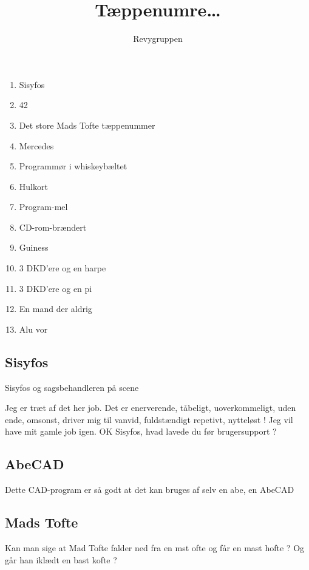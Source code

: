\documentclass[danish]{article}
\title{Tæppenumre\ldots}
\author{Revygruppen}
\begin{document}
\maketitle

\begin{sketch}
\begin{enumerate}
\item Sisyfos
\item 42
\item Det store Mads Tofte tæppenummer
\item Mercedes
\item Programmør i whiskeybæltet
\item Hulkort
\item Program-mel
\item CD-rom-brændert
\item Guiness
\item 3 DKD'ere og en harpe
\item 3 DKD'ere og en pi
\item En mand der aldrig
\item Alu vor
\end{enumerate}

\subsection*{Sisyfos}
\begin{roles}
\end{roles}

\scene Sisyfos og sagsbehandleren på scene

 Jeg er træt af det her job. Det er enerverende, tåbeligt,
uoverkommeligt, uden ende, omsonst, driver mig til vanvid, fuldstændigt
repetivt, nytteløst ! Jeg vil have mit gamle job igen.
 OK Sisyfos, hvad lavede du før brugersupport ?


\subsection*{AbeCAD}

Dette CAD-program er så godt at det kan bruges af selv en abe, en AbeCAD


\subsection*{Mads Tofte}
 Kan man sige at Mad Tofte falder ned fra en mst ofte og får en mast hofte ?
 Og går han iklædt en bast kofte ?




\end{sketch}
\end{document}
